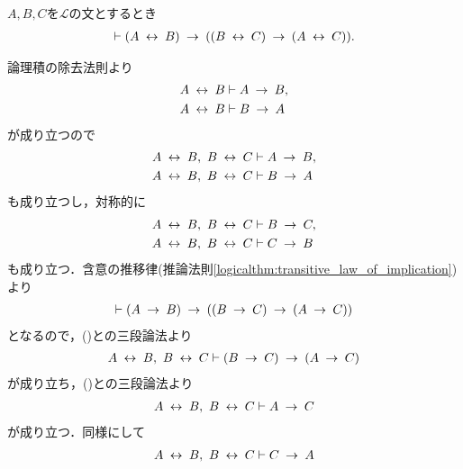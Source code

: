 	\begin{screen}
		\begin{logicalthm}[同値関係の推移律]
		\label{logicalthm:transitive_law_of_equivalence_symbol}
			$A,B,C$を$\mathcal{L}$の文とするとき
			\begin{align}
				\vdash (A \lrarrow B) \rarrow ((B \lrarrow C) \rarrow 
				(A \lrarrow C)).
			\end{align}
		\end{logicalthm}
	\end{screen}
	
	\begin{sketch}
		論理積の除去法則より
		\begin{align}
			A \lrarrow B &\vdash A \rarrow B, \\
			A \lrarrow B &\vdash B \rarrow A
		\end{align}
		が成り立つので
		\begin{align}
			A \lrarrow B,\ B \lrarrow C &\vdash A \rarrow B, 
			\label{fom:transitive_law_of_equivalence_symbol_1} \\
			A \lrarrow B,\ B \lrarrow C &\vdash B \rarrow A
		\end{align}
		も成り立つし，対称的に
		\begin{align}
			A \lrarrow B,\ B \lrarrow C &\vdash B \rarrow C, 
			\label{fom:transitive_law_of_equivalence_symbol_2} \\
			A \lrarrow B,\ B \lrarrow C &\vdash C \rarrow B
		\end{align}
		も成り立つ．含意の推移律(推論法則\ref{logicalthm:transitive_law_of_implication})より
		\begin{align}
			\vdash (A \rarrow B) \rarrow ((B \rarrow C) \rarrow (A \rarrow C))
		\end{align}
		となるので，()との三段論法より
		\begin{align}
			A \lrarrow B,\ B \lrarrow C \vdash (B \rarrow C) \rarrow (A \rarrow C)
		\end{align}
		が成り立ち，()との三段論法より
		\begin{align}
			A \lrarrow B,\ B \lrarrow C \vdash A \rarrow C
			\label{fom:transitive_law_of_equivalence_symbol_3}
		\end{align}
		が成り立つ．同様にして
		\begin{align}
			A \lrarrow B,\ B \lrarrow C \vdash C \rarrow A
			\label{fom:transitive_law_of_equivalence_symbol_4}
		\end{align}

\end{sketch}
